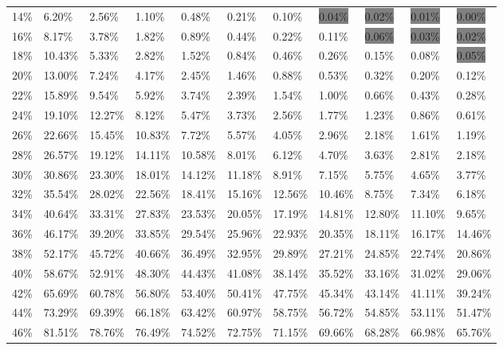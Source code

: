\documentclass[letterpaper,12pt]{report}
\begin{document}
\begin{table}
{\begin{tabular}{l|llllllllll}
    14\% & 6.20\%  & 2.56\%  & 1.10\%  & 0.48\%  & 0.21\%  & 0.10\%  & \colorbox{gray}{0.04\%}  & \colorbox{gray}{0.02\%}  & \colorbox{gray}{0.01\%}  & \colorbox{gray}{0.00\%}  \\
    16\% & 8.17\%  & 3.78\%  & 1.82\%  & 0.89\%  & 0.44\%  & 0.22\%  & 0.11\%  & \colorbox{gray}{0.06\%}  & \colorbox{gray}{0.03\%}  & \colorbox{gray}{0.02\%}  \\
    18\% & 10.43\% & 5.33\%  & 2.82\%  & 1.52\%  & 0.84\%  & 0.46\%  & 0.26\%  & 0.15\%  & 0.08\%  & \colorbox{gray}{0.05\%}  \\
    20\% & 13.00\% & 7.24\%  & 4.17\%  & 2.45\%  & 1.46\%  & 0.88\%  & 0.53\%  & 0.32\%  & 0.20\%  & 0.12\%  \\
    22\% & 15.89\% & 9.54\%  & 5.92\%  & 3.74\%  & 2.39\%  & 1.54\%  & 1.00\%  & 0.66\%  & 0.43\%  & 0.28\%  \\
    24\% & 19.10\% & 12.27\% & 8.12\%  & 5.47\%  & 3.73\%  & 2.56\%  & 1.77\%  & 1.23\%  & 0.86\%  & 0.61\%  \\
    26\% & 22.66\% & 15.45\% & 10.83\% & 7.72\%  & 5.57\%  & 4.05\%  & 2.96\%  & 2.18\%  & 1.61\%  & 1.19\%  \\
    28\% & 26.57\% & 19.12\% & 14.11\% & 10.58\% & 8.01\%  & 6.12\%  & 4.70\%  & 3.63\%  & 2.81\%  & 2.18\%  \\
    30\% & 30.86\% & 23.30\% & 18.01\% & 14.12\% & 11.18\% & 8.91\%  & 7.15\%  & 5.75\%  & 4.65\%  & 3.77\%  \\
    32\% & 35.54\% & 28.02\% & 22.56\% & 18.41\% & 15.16\% & 12.56\% & 10.46\% & 8.75\%  & 7.34\%  & 6.18\%  \\
    34\% & 40.64\% & 33.31\% & 27.83\% & 23.53\% & 20.05\% & 17.19\% & 14.81\% & 12.80\% & 11.10\% & 9.65\%  \\
    36\% & 46.17\% & 39.20\% & 33.85\% & 29.54\% & 25.96\% & 22.93\% & 20.35\% & 18.11\% & 16.17\% & 14.46\% \\
    38\% & 52.17\% & 45.72\% & 40.66\% & 36.49\% & 32.95\% & 29.89\% & 27.21\% & 24.85\% & 22.74\% & 20.86\% \\
    40\% & 58.67\% & 52.91\% & 48.30\% & 44.43\% & 41.08\% & 38.14\% & 35.52\% & 33.16\% & 31.02\% & 29.06\% \\
    42\% & 65.69\% & 60.78\% & 56.80\% & 53.40\% & 50.41\% & 47.75\% & 45.34\% & 43.14\% & 41.11\% & 39.24\% \\
    44\% & 73.29\% & 69.39\% & 66.18\% & 63.42\% & 60.97\% & 58.75\% & 56.72\% & 54.85\% & 53.11\% & 51.47\% \\
    46\% & 81.51\% & 78.76\% & 76.49\% & 74.52\% & 72.75\% & 71.15\% & 69.66\% & 68.28\% & 66.98\% & 65.76\% \\

\end{tabular}}
\end{table}
\end{document}
